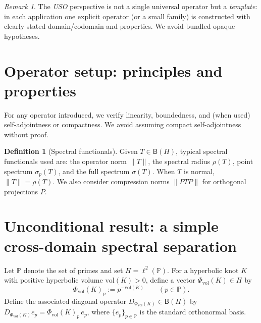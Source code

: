 \documentclass[11pt]{article}
\theoremstyle{definition}
\newtheorem{definition}[theorem]{Definition}
\theoremstyle{remark}
\newtheorem{remark}[theorem]{Remark}
\newcommand{\PP}{\mathbb{P}} %
\newcommand{\1}{\mathbf{1}}
\begin{document}
\begin{remark}
The \emph{USO} perspective is not a single universal operator but a \emph{template}: in each application one explicit operator (or a small family) is constructed with clearly stated domain/codomain and properties. We avoid bundled opaque hypotheses.
\end{remark}

\section{Operator setup: principles and properties}
For any operator introduced, we verify linearity, boundedness, and (when used) self-adjointness or compactness. We avoid assuming compact self-adjointness without proof.

\begin{definition}[Spectral functionals]
Given $T\in\mathsf{B}(H)$, typical spectral functionals used are: the operator norm $\|T\|$, the spectral radius $\rho(T)$, point spectrum $\sigma_p(T)$, and the full spectrum $\sigma(T)$. When $T$ is normal, $\|T\|=\rho(T)$. We also consider compression norms $\|PTP\|$ for orthogonal projections $P$.
\end{definition}

\section{Unconditional result: a simple cross-domain spectral separation}
Let $\PP$ denote the set of primes and set $H=\ell^2(\PP)$. For a hyperbolic knot $K$ with positive hyperbolic volume $\mathrm{vol}(K)>0$, define a vector $\Phi_{\mathrm{vol}}(K)\in H$ by
\[
  \Phi_{\mathrm{vol}}(K)_p := p^{-\mathrm{vol}(K)} \qquad (p\in\PP).
\]
Define the associated diagonal operator $D_{\Phi_{\mathrm{vol}}(K)}\in\mathsf{B}(H)$ by $D_{\Phi_{\mathrm{vol}}(K)} e_p = \Phi_{\mathrm{vol}}(K)_p\, e_p$, where $\{e_p\}_{p\in\PP}$ is the standard orthonormal basis.
\end{document}
